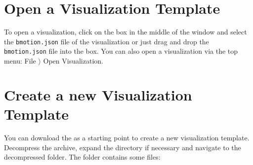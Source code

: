 \section{Open a Visualization Template}
\label{open_vis_template}

To open a visualization, click on the box in the middle of the window and select the \texttt{bmotion.json} file of the visualization or just drag and drop the \texttt{bmotion.json} file into the box.
You can also open a visualization via the top menu: \textsf{File $\rangle$ Open Visualization}.

\section{Create a new Visualization Template}
\label{vis_template}

You can download the  as a starting point to create a new visualization template.
Decompress the archive, expand the directory if necessary and navigate to the decompressed folder.
The folder contains some files:



